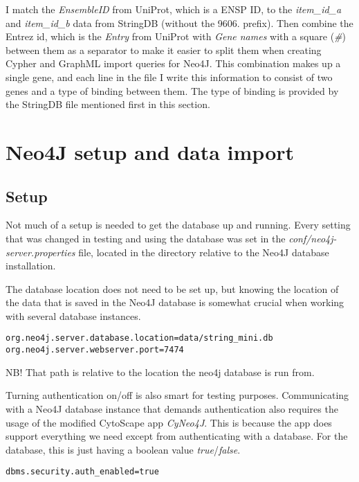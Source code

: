 I match the \textit{EnsembleID} from UniProt, which is a ENSP ID, to the
\textit{item\_id\_a} and \textit{item\_id\_b} data from StringDB (without the
9606.  prefix). Then combine the Entrez id, which is the \textit{Entry} from
UniProt with \textit{Gene names} with a square (\textit{\#}) between them as
a separator to make it easier to split them when creating Cypher and GraphML
import queries for Neo4J. This combination makes up a single gene, and each line
in the file I write this information to consist of two genes and a type of
binding between them. The type of binding is provided by the StringDB file
mentioned first in this section. %


\section{Neo4J setup and data import}

\subsection{Setup}
Not much of a setup is needed to get the database up and running. Every setting
that was changed in testing and using the database was set in the
\textit{conf/neo4j-server.properties} file, located in the directory relative to
the Neo4J database installation.

The database
location does not need to be set up, but knowing the location of the data that
is saved in the Neo4J database is somewhat crucial when working with several
database instances.

\begin{verbatim}
org.neo4j.server.database.location=data/string_mini.db
org.neo4j.server.webserver.port=7474
\end{verbatim}

NB! That path is relative to the location the neo4j database is run from.

Turning authentication on/off is also smart for testing purposes. Communicating
with a Neo4J database instance that demands authentication also requires the
usage of the modified CytoScape app \textit{CyNeo4J}. This is because the app
does support everything we need except from authenticating with a database. For
the database, this is just having a boolean value \textit{true}/\textit{false}.

\begin{verbatim}
dbms.security.auth_enabled=true
\end{verbatim}

